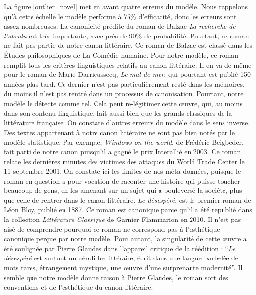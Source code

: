 La figure \ref{outlier_novel} met en avant quatre erreurs du modèle. Nous rappelons qu'à cette échelle le modèle performe à 75\% d'efficacité, donc les erreurs sont assez nombreuses. La canonicité prédite du roman de Balzac \textit{La recherche de l'absolu} est très importante, avec près de 90\% de probabilité. Pourtant, ce roman ne fait pas partie de notre canon littéraire. Ce roman de Balzac est classé dans les Études philosophiques de La Comédie humaine. Pour notre modèle, ce roman remplit tous les critères linguistiques relatifs au canon littéraire. Il en va de même pour le roman de Marie Darrieussecq, \textit{Le mal de mer}, qui pourtant est publié 150 années plus tard. Ce dernier n'est pas particulièrement resté dans les mémoires, du moins il n'est pas rentré dans un processus de canonisation. Pourtant, notre modèle le détecte comme tel. Cela peut re-légitimer cette œuvre, qui, au moins dans son contenu linguistique, fait aussi bien que les grands classiques de la littérature française. On constate d'autres erreurs du modèle dans le sens inverse. Des textes appartenant à notre canon littéraire ne sont pas bien notés par le modèle statistique. Par exemple, \textit{Windows on the world}, de Frédéric Beigbeder, fait parti de notre canon puisqu'il a gagné le prix Interallié en 2003. Ce roman relate les dernières minutes des victimes des attaques du World Trade Center le 11 septembre 2001. On constate ici les limites de nos méta-données, puisque le roman en question a pour vocation de raconter une histoire qui puisse toucher beaucoup de gens, en les amenant sur un sujet qui a bouleversé la société, plus que celle de rentrer dans le canon littéraire. \textit{Le désespéré}, est le premier roman de Léon Bloy, publié en 1887. Ce roman est canonique parce qu'il a été republié dans la collection \textit{Littérature Classique} de Garnier Flammarion en 2010. Il n'est pas aisé de comprendre pourquoi ce roman ne correspond pas à l'esthétique canonique perçue par notre modèle. Pour autant, la singularité de cette œuvre a été soulignée par Pierre Glaudes dans l'appareil critique de la réédition : \enquote{\textit{Le désespéré} est surtout un aérolithe littéraire, écrit dans une langue barbelée de mots rares, étrangement mystique, une œuvre d'une surprenante modernité}. Il semble que notre modèle donne raison à Pierre Glaudes, le roman sort des conventions et de l'esthétique du canon littéraire. 


